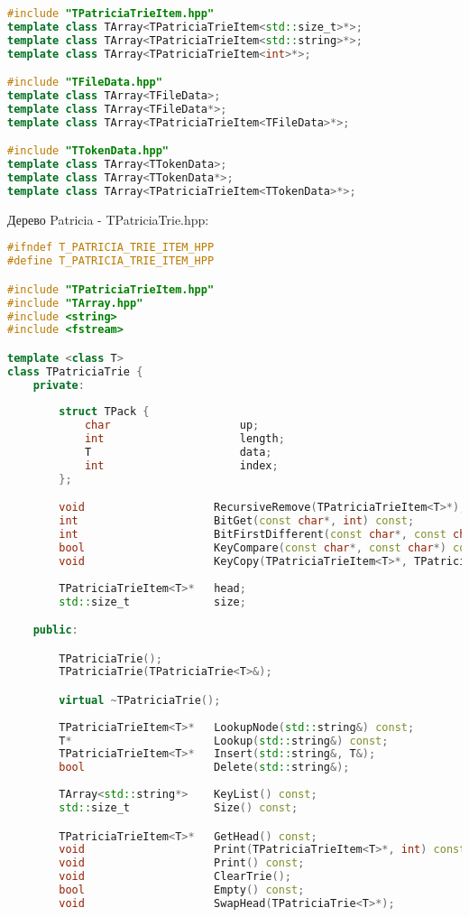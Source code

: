 \begin{lstlisting}[language=C++]
#include "TPatriciaTrieItem.hpp"
template class TArray<TPatriciaTrieItem<std::size_t>*>;
template class TArray<TPatriciaTrieItem<std::string>*>;
template class TArray<TPatriciaTrieItem<int>*>;

#include "TFileData.hpp"
template class TArray<TFileData>;
template class TArray<TFileData*>;
template class TArray<TPatriciaTrieItem<TFileData>*>;

#include "TTokenData.hpp"
template class TArray<TTokenData>;
template class TArray<TTokenData*>;
template class TArray<TPatriciaTrieItem<TTokenData>*>;
\end{lstlisting}

Дерево Patricia - TPatriciaTrie.hpp:
\begin{lstlisting}[language=C++]
#ifndef T_PATRICIA_TRIE_ITEM_HPP
#define T_PATRICIA_TRIE_ITEM_HPP

#include "TPatriciaTrieItem.hpp"
#include "TArray.hpp"
#include <string>
#include <fstream>

template <class T>
class TPatriciaTrie {
    private:
        
        struct TPack {
            char                    up;
            int                     length;
            T                       data;
            int                     index;
        };

        void                    RecursiveRemove(TPatriciaTrieItem<T>*);
        int                     BitGet(const char*, int) const;
        int                     BitFirstDifferent(const char*, const char*) const;
        bool                    KeyCompare(const char*, const char*) const;
        void                    KeyCopy(TPatriciaTrieItem<T>*, TPatriciaTrieItem<T>*);
        
        TPatriciaTrieItem<T>*   head;
        std::size_t             size;

    public:

        TPatriciaTrie();
        TPatriciaTrie(TPatriciaTrie<T>&);

        virtual ~TPatriciaTrie();
        
        TPatriciaTrieItem<T>*   LookupNode(std::string&) const;
        T*                      Lookup(std::string&) const;
        TPatriciaTrieItem<T>*   Insert(std::string&, T&);
        bool                    Delete(std::string&);
        
        TArray<std::string*>    KeyList() const;
        std::size_t             Size() const;

        TPatriciaTrieItem<T>*   GetHead() const;
        void                    Print(TPatriciaTrieItem<T>*, int) const;
        void                    Print() const;
        void                    ClearTrie();
        bool                    Empty() const;
        void                    SwapHead(TPatriciaTrie<T>*);
        

\end{lstlisting}
